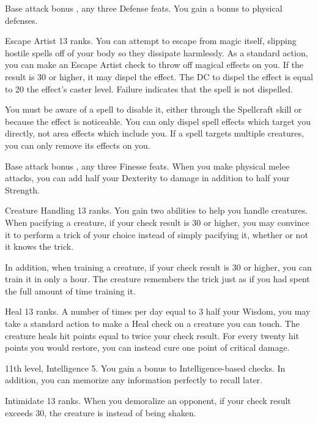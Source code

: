 \featpre Base attack bonus , any three Defense feats.
\featben You gain a  bonus to physical defenses.

\featpre Escape Artist 13 ranks.
\featben You can attempt to escape from magic itself, slipping hostile spells off of your body so they dissipate harmlessly. As a standard action, you can make an Escape Artist check to throw off magical effects on you. If the result is 30 or higher, it may dispel the effect. The DC to dispel the effect is equal to 20 \add the effect's caster level. Failure indicates that the spell is not dispelled.

You must be aware of a spell to disable it, either through the Spellcraft skill or because the effect is noticeable. You can only dispel spell effects which target you directly, not area effects which include you. If a spell targets multiple creatures, you can only remove its effects on you.

\featpre Base attack bonus , any three Finesse feats.
\featben When you make physical melee attacks, you can add half your Dexterity to damage in addition to half your Strength.

\featpre Creature Handling 13 ranks.
\featben You gain two abilities to help you handle creatures. When pacifying a creature, if your check result is 30 or higher, you may convince it to perform a trick of your choice instead of simply pacifying it, whether or not it knows the trick.

In addition, when training a creature, if your check result is 30 or higher, you can train it in only a hour. The creature remembers the trick just as if you had spent the full amount of time training it.

\featpre Heal 13 ranks.
\featben A number of times per day equal to 3 \add half your Wisdom, you may take a standard action to make a Heal check on a creature you can touch. The creature heals hit points equal to twice your check result. For every twenty hit points you would restore, you can instead cure one point of critical damage.

\featpre 11th level, Intelligence 5.
\featben You gain a  bonus to Intelligence-based checks. In addition, you can memorize any information perfectly to recall later.

\featpre Intimidate 13 ranks.
\featben When you demoralize an opponent, if your check result exceeds 30, the creature is \frightened instead of being shaken.

